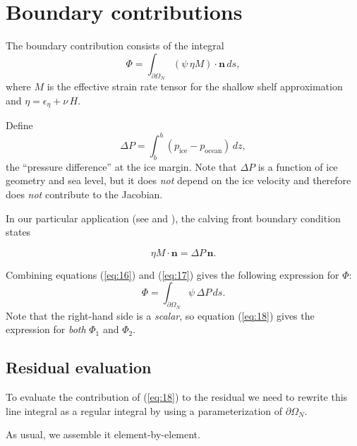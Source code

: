 \documentclass{amsart}
\newcommand{\N}{\mathbf{n}}
\newcommand{\boundary}{\partial \Omega_N}
\newcommand{\bI}{\ensuremath{\int_{\boundary}}}
\newcommand{\etaM}{\ensuremath{\eta M}}
\begin{document}
\section{Boundary contributions}
\label{sec:boundary}

The boundary contribution consists of the integral
\begin{equation}
  \label{eq:15}
  \Phi = \bI (\psi\, \etaM) \cdot \N\, ds,
\end{equation}
where $M$ is the effective strain rate tensor for the shallow shelf
approximation and $\eta = \epsilon_{\eta} + \nu\, H$.

Define
\newcommand{\dP}{\Delta P}
\begin{equation}
  \label{eq:17}
  \dP = \int_{b}^{h} (p_{\mathrm{ice}} - p_{\mathrm{ocean}})\,dz,
\end{equation}
the ``pressure difference'' at the ice margin. Note that $\dP$ is a function of ice geometry and sea level, but it does \emph{not} depend on the ice velocity and therefore does \emph{not} contribute to the Jacobian.

In our particular application (see \cite{GreveBlatter2009} and \cite{KhroulevBueler2013}), the calving front boundary condition states

\begin{equation}
  \label{eq:16}
  \etaM \cdot \N = \dP\, \N.
\end{equation}

Combining equations (\ref{eq:16}) and (\ref{eq:17}) gives the following expression for $\Phi$:
\begin{equation}
  \label{eq:18}
  \Phi = \bI \psi\, \dP\,ds.
\end{equation}
Note that the right-hand side is a \emph{scalar}, so equation (\ref{eq:18}) gives the expression for \emph{both} $\Phi_{1}$ and $\Phi_{2}$.

\subsection{Residual evaluation}
\label{sec:boundary-residual}

To evaluate the contribution of (\ref{eq:18}) to the residual we need to rewrite this line integral as a regular integral by using a parameterization of $\boundary$.

As usual, we assemble it element-by-element.



\end{document}
